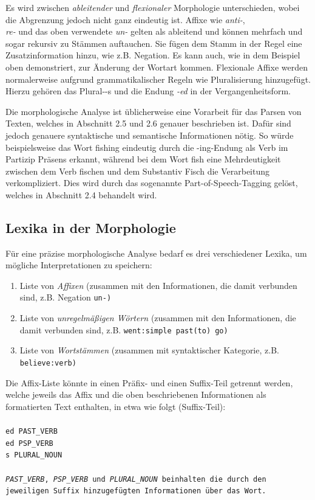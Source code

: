 \documentclass[12pt]{report}
\begin{document}
Es wird zwischen \textit{ableitender} und \textit{flexionaler} Morphologie unterschieden, wobei die Abgrenzung jedoch nicht ganz eindeutig ist. Affixe wie \textit{\glqq  anti-\grqq{}},\\ \textit{\glqq  re-\grqq{}} und das oben verwendete \textit{\glqq  un-\grqq{}} gelten als ableitend und können mehrfach und sogar rekursiv zu Stämmen auftauchen. Sie fügen dem Stamm in der Regel eine Zusatzinformation hinzu, wie z.B. Negation. Es kann auch, wie in dem Beispiel oben demonstriert, zur Änderung der Wortart kommen. Flexionale Affixe werden normalerweise aufgrund grammatikalischer Regeln wie Pluralisierung hinzugefügt. Hierzu gehören das Plural-\glqq  -s\grqq{} und die Endung \textit{\glqq  -ed\grqq{}} in der Vergangenheitsform. 

Die morphologische Analyse ist üblicherweise eine Vorarbeit für das Parsen von Texten, welches in Abschnitt 2.5 und 2.6 genauer beschrieben ist. Dafür sind jedoch genauere syntaktische und semantische Informationen nötig. So würde beispielsweise das Wort \glqq  fishing\grqq{} eindeutig durch die \glqq  -ing\grqq{}-Endung als Verb im Partizip Präsens erkannt, während bei dem Wort \glqq  fish\grqq{} eine Mehrdeutigkeit zwischen dem Verb \glqq  fischen\grqq{} und dem Substantiv \glqq  Fisch\grqq{} die Verarbeitung verkompliziert. Dies wird durch das sogenannte Part-of-Speech-Tagging gelöst, welches in Abschnitt 2.4 behandelt wird.

\subsection{Lexika in der Morphologie}
Für eine präzise morphologische Analyse bedarf es drei verschiedener Lexika, um mögliche Interpretationen zu speichern:

\begin{enumerate}
\item Liste von \textit{Affixen} (zusammen mit den Informationen, die damit verbunden sind, z.B. Negation \tt \glqq  un-\grqq{}\rm)
\item Liste von \textit{unregelmäßigen Wörtern} (zusammen mit den Informationen, die damit verbunden sind, z.B. \tt \glqq  went\grqq{}:simple past\glqq  (to) go\grqq{}\rm)
\item Liste von \textit{Wortstämmen} (zusammen mit syntaktischer Kategorie, z.B. \tt \glqq  believe\grqq{}:verb\rm)
\end{enumerate}

Die Affix-Liste könnte in einen Präfix- und einen Suffix-Teil getrennt werden, welche jeweils das Affix und die oben beschriebenen Informationen als formatierten Text enthalten, in etwa wie folgt (Suffix-Teil):
\\
\tt\\
ed PAST\_VERB\\
ed PSP\_VERB\\
s PLURAL\_NOUN\\
\rm\\
\textit{PAST\_VERB}, \textit{PSP\_VERB} und \textit{PLURAL\_NOUN} beinhalten die durch den jeweiligen Suffix hinzugefügten Informationen über das Wort. 
\end{document}
